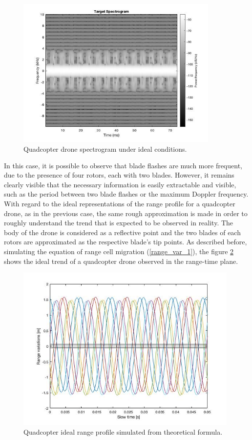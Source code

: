 \begin{figure}[h!]
\centering
\includegraphics[width=10cm]{FMCW mD analysis-chap4/img/quad_ideal_spect.jpg}
\caption{Quadcopter drone spectrogram under ideal conditions.\cite{tesiligresti}}
\label{ideal_quad_spect}
\end{figure}

In this case, it is possible to observe that blade flashes are much more frequent, due to the presence of four rotors, each with two blades. However, it remains clearly visible that the necessary information is easily extractable and visible, such as the period between two blade flashes or the maximum Doppler frequency.\\
With regard to the ideal representations of the range profile for a quadcopter drone, as in the previous case, the same rough approximation is made in order to roughly understand the trend that is expected to be observed in reality. The body of the drone is considered as a reflective point and the two blades of each rotors are approximated as the respective blade's tip points. As described before, simulating the equation of range cell migration (\ref{range_var_1}), the figure \ref{quad_r_t_ideal} shows the ideal trend of a quadcopter drone observed in the range-time plane.

\begin{figure}[h!]
\centering
\includegraphics[width=11cm]{FMCW mD analysis-chap4/img/quad_r_t_ideal.jpg}
\caption{Quadcopter ideal range profile simulated from theoretical formula.}
\label{quad_r_t_ideal}
\end{figure}

